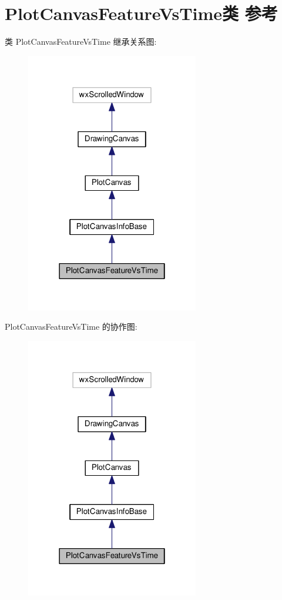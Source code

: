 \hypertarget{class_plot_canvas_feature_vs_time}{\section{Plot\+Canvas\+Feature\+Vs\+Time类 参考}
\label{class_plot_canvas_feature_vs_time}
}


类 Plot\+Canvas\+Feature\+Vs\+Time 继承关系图\+:
\nopagebreak
\begin{figure}[H]
\begin{center}
\leavevmode
\includegraphics[width=214pt]{class_plot_canvas_feature_vs_time__inherit__graph}
\end{center}
\end{figure}


Plot\+Canvas\+Feature\+Vs\+Time 的协作图\+:
\nopagebreak
\begin{figure}[H]
\begin{center}
\leavevmode
\includegraphics[width=214pt]{class_plot_canvas_feature_vs_time__coll__graph}
\end{center}
\end{figure}
